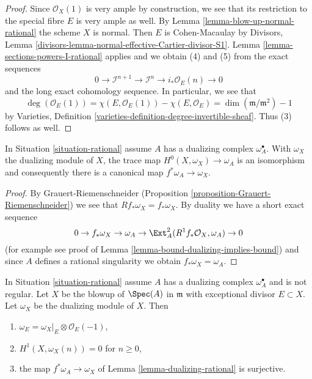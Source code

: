 \begin{proof}
Since $\mathcal{O}_X(1)$ is very ample by construction, we see that
its restriction to the special fibre $E$ is very ample as well.
By Lemma \ref{lemma-blow-up-normal-rational} the scheme $X$ is normal.
Then $E$ is Cohen-Macaulay by
Divisors, Lemma \ref{divisors-lemma-normal-effective-Cartier-divisor-S1}.
Lemma \ref{lemma-sections-powers-I-rational} applies and we obtain
(4) and (5) from the exact sequences
$$
0 \to \mathcal{I}^{n + 1} \to \mathcal{I}^n \to i_*\mathcal{O}_E(n) \to 0
$$
and the long exact cohomology sequence. In particular, we see that
$$
\deg(\mathcal{O}_E(1)) = \chi(E, \mathcal{O}_E(1)) - \chi(E, \mathcal{O}_E) =
\dim(\mathfrak m/\mathfrak m^2) - 1
$$
by Varieties, Definition \ref{varieties-definition-degree-invertible-sheaf}.
Thus (3) follows as well.
\end{proof}

\begin{lemma}
\label{lemma-dualizing-rational}
In Situation \ref{situation-rational} assume $A$ has a
dualizing complex $\omega_A^\bullet$. With $\omega_X$ the dualizing
module of $X$, the trace map $H^0(X, \omega_X) \to \omega_A$ is an
isomorphism and consequently there is a canonical map
$f^*\omega_A \to \omega_X$.
\end{lemma}

\begin{proof}
By Grauert-Riemenschneider
(Proposition \ref{proposition-Grauert-Riemenschneider}) we see that
$Rf_*\omega_X = f_*\omega_X$. By duality we have a short exact
sequence
$$
0 \to f_*\omega_X \to \omega_A \to
\Ext^2_A(R^1f_*\mathcal{O}_X, \omega_A) \to 0
$$
(for example see proof of Lemma \ref{lemma-bound-dualizing-implies-bound})
and since $A$ defines a rational singularity we obtain
$f_*\omega_X = \omega_A$.
\end{proof}

\begin{lemma}
\label{lemma-dualizing-blow-up-rational}
In Situation \ref{situation-rational} assume $A$ has a
dualizing complex $\omega_A^\bullet$ and is not regular.
Let $X$ be the blowup of $\Spec(A)$ in $\mathfrak m$ with
exceptional divisor $E \subset X$. Let $\omega_X$
be the dualizing module of $X$. Then
\begin{enumerate}
\item $\omega_E = \omega_X|_E \otimes \mathcal{O}_E(-1)$,
\item $H^1(X, \omega_X(n)) = 0$ for $n \geq 0$,
\item the map $f^*\omega_A \to \omega_X$ of
Lemma \ref{lemma-dualizing-rational} is surjective.
\end{enumerate}
\end{lemma}

